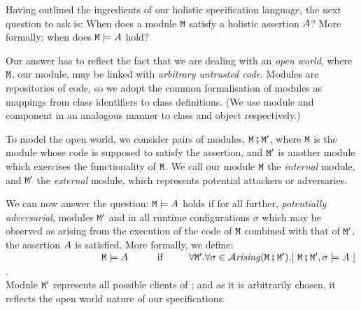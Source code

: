 
Having outlined the ingredients of our holistic specification
language, the next question to ask is: When does a module ${\mbox{\tt{\ensuremath{{\mbox{\tt{M}}}}}}}$ satisfy
a holistic assertion $A$?  More formally: when does
%
${\mbox{\tt{\ensuremath{{\mbox{\tt{M}}}}}}} \models A$ 
hold? 
  
Our answer has to reflect the fact that we are dealing with an 
\emph{open  world},  where  ${\mbox{\tt{\ensuremath{{\mbox{\tt{M}}}}}}}$, our module, may be
linked with \textit{arbitrary untrusted code}.
Modules are repositories of code, so we adopt the common formalisation 
of modules as  mappings from
class identifiers to class definitions.
(We use module and component in an analogous manner to class and object respectively.)

%
%
%
To model the open world, we consider
 pairs of modules, 
${\mbox{\tt{\ensuremath{{\mbox{\tt{M}}}}}}} \fatsemi {{\mbox{\tt{\ensuremath{{\mbox{\tt{M}}}}}}}'}$,  where ${\mbox{\tt{\ensuremath{{\mbox{\tt{M}}}}}}}$ is the module 
whose code is supposed to satisfy the assertion,
and ${\mbox{\tt{\ensuremath{{\mbox{\tt{M}}}}}}}'$  is  another %
 module which exercises
the functionality of ${\mbox{\tt{\ensuremath{{\mbox{\tt{M}}}}}}}$. We call our module ${\mbox{\tt{\ensuremath{{\mbox{\tt{M}}}}}}}$ the {\em internal} module, and
 ${\mbox{\tt{\ensuremath{{\mbox{\tt{M}}}}}}}'$ the {\em external} module, which represents potential
 attackers or adversaries.
    
We can now answer the question: ${\mbox{\tt{\ensuremath{{\mbox{\tt{M}}}}}}} \models A$ 
 holds if for all further, {\em potentially adversarial}, modules ${\mbox{\tt{\ensuremath{{\mbox{\tt{M}}}}}}}'$ and in  all runtime configurations $\sigma$ which may be observed as arising from the  execution of the code of ${\mbox{\tt{\ensuremath{{\mbox{\tt{M}}}}}}}$ combined with that of ${\mbox{\tt{\ensuremath{{\mbox{\tt{M}}}}}}}'$, the assertion $A$ is satisfied. More formally, we define:\\
$~ \strut  \hspace{1.3in} \M \models \A \ \ \  \ \ \ \ \ \mbox{
if               } \ \ \  \ \ \  \  \forall \M'.\forall \sigma\in\Arising
{\M \mkpair  {\M'}}. [\ \M \mkpair  {\M'},\sigma \models \A\ ]$.  \\
Module ${\mbox{\tt{\ensuremath{{\mbox{\tt{M}}}}}}}'$ represents all possible clients of {\M}; and as it is arbitrarily chosen, it reflects the open world nature of our specifications.%

